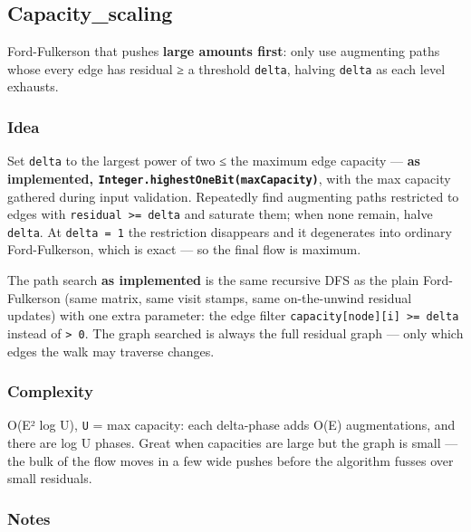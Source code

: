 \documentclass[
  10pt,
  letterpaper,
  onecolumn]{article}
\begin{document}
\hypertarget{capacity_scaling}{%
\subsection{Capacity\_scaling}\label{capacity_scaling}}

Ford-Fulkerson that pushes \textbf{large amounts first}: only use
augmenting paths whose every edge has residual ≥ a threshold
\texttt{delta}, halving \texttt{delta} as each level exhausts.

\hypertarget{idea-26}{%
\subsubsection{Idea}\label{idea-26}}

Set \texttt{delta} to the largest power of two ≤ the maximum edge
capacity --- \textbf{as implemented,
\texttt{Integer.highestOneBit(maxCapacity)}}, with the max capacity
gathered during input validation. Repeatedly find augmenting paths
restricted to edges with \texttt{residual\ \textgreater{}=\ delta} and
saturate them; when none remain, halve \texttt{delta}. At
\texttt{delta\ =\ 1} the restriction disappears and it degenerates into
ordinary Ford-Fulkerson, which is exact --- so the final flow is
maximum.

The path search \textbf{as implemented} is the same recursive DFS as the
plain Ford-Fulkerson (same matrix, same visit stamps, same on-the-unwind
residual updates) with one extra parameter: the edge filter
\texttt{capacity{[}node{]}{[}i{]}\ \textgreater{}=\ delta} instead of
\texttt{\textgreater{}\ 0}. The graph searched is always the full
residual graph --- only which edges the walk may traverse changes.

\hypertarget{complexity-26}{%
\subsubsection{Complexity}\label{complexity-26}}

O(E² log U), \texttt{U} = max capacity: each delta-phase adds O(E)
augmentations, and there are log U phases. Great when capacities are
large but the graph is small --- the bulk of the flow moves in a few
wide pushes before the algorithm fusses over small residuals.

\hypertarget{notes-25}{%
\subsubsection{Notes}\label{notes-25}}
\end{document}
